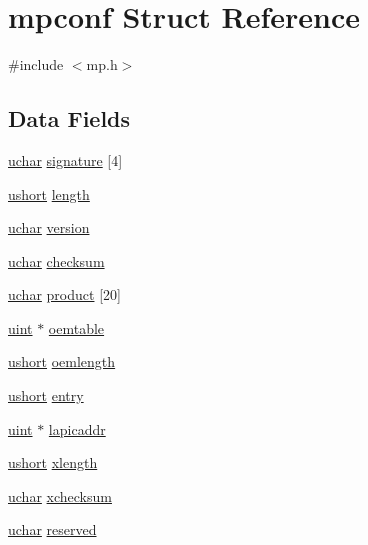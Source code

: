 \hypertarget{structmpconf}{\section{mpconf Struct Reference}
\label{structmpconf}
}


{\ttfamily \#include $<$mp.\-h$>$}

\subsection*{Data Fields}
\begin{DoxyCompactItemize}
\item 
\hyperlink{types_8h_a65f85814a8290f9797005d3b28e7e5fc}{uchar} \hyperlink{structmpconf_a086ff3269e8b74e0f05b9120d4cac23b}{signature} \mbox{[}4\mbox{]}
\item 
\hyperlink{types_8h_ab95f123a6c9bcfee6a343170ef8c5f69}{ushort} \hyperlink{structmpconf_a795f4a78591a76d2ee53790ded8bff1f}{length}
\item 
\hyperlink{types_8h_a65f85814a8290f9797005d3b28e7e5fc}{uchar} \hyperlink{structmpconf_aa6ea6b1d12a723848cc34b199ddd8aef}{version}
\item 
\hyperlink{types_8h_a65f85814a8290f9797005d3b28e7e5fc}{uchar} \hyperlink{structmpconf_a282c64bb49f098de8b45dfc535c91ac5}{checksum}
\item 
\hyperlink{types_8h_a65f85814a8290f9797005d3b28e7e5fc}{uchar} \hyperlink{structmpconf_a09544b0a747e1c8a0ff64be0392f5c43}{product} \mbox{[}20\mbox{]}
\item 
\hyperlink{types_8h_a91ad9478d81a7aaf2593e8d9c3d06a14}{uint} $\ast$ \hyperlink{structmpconf_a4a32c8dcc1dc530dd624029c57e7cc5c}{oemtable}
\item 
\hyperlink{types_8h_ab95f123a6c9bcfee6a343170ef8c5f69}{ushort} \hyperlink{structmpconf_a1ceb9c0f37d610f220e21ff80705be9c}{oemlength}
\item 
\hyperlink{types_8h_ab95f123a6c9bcfee6a343170ef8c5f69}{ushort} \hyperlink{structmpconf_a9386724f6cb6fb5065503234c8fcf67f}{entry}
\item 
\hyperlink{types_8h_a91ad9478d81a7aaf2593e8d9c3d06a14}{uint} $\ast$ \hyperlink{structmpconf_a4a155d16bc3b1fec01b4ec50b2034005}{lapicaddr}
\item 
\hyperlink{types_8h_ab95f123a6c9bcfee6a343170ef8c5f69}{ushort} \hyperlink{structmpconf_a74abe1c31d3783b9bb39334ffad032b6}{xlength}
\item 
\hyperlink{types_8h_a65f85814a8290f9797005d3b28e7e5fc}{uchar} \hyperlink{structmpconf_a6f8d578004c11e0bdbf514588ccb1697}{xchecksum}
\item 
\hyperlink{types_8h_a65f85814a8290f9797005d3b28e7e5fc}{uchar} \hyperlink{structmpconf_a8d5874ade2fd6c06fdfd5530f0ec417d}{reserved}
\end{DoxyCompactItemize}


